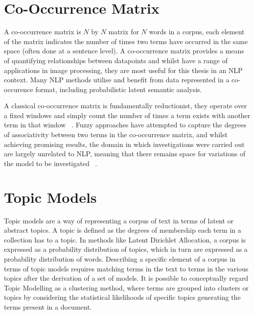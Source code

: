 \documentclass[10pt]{report}
\begin{document}
\section{Co-Occurrence Matrix}
A co-occurrence matrix is $N$ by $N$ matrix for $N$ words in a corpus, each element of the matrix indicates the number of times two terms have occurred in the same space (often done at a sentence level). A co-occurrence matrix provides a means of quantifying relationships between datapoints and whilst have a range of applications in image processing, they are most useful for this thesis in an NLP context. Many NLP methods utilise and benefit from data represented in a co-occurence format, including probabilistic latent semantic analysis.~\cite{Hofmann1999-qb}

A classical co-occurrence matrix is fundamentally reductionist, they operate over a fixed windows and simply count the number of times a term exists with another term in that window ~\cite{Lin2008-ss, Biemann2006-ke}. Fuzzy approaches have attempted to capture the degrees of associativity between two terms in the co-occurrence matrix, and whilst achieving promising results, the domain in which investigations were carried out are largely unrelated to NLP, meaning that there remains space for variations of the model to be investigated ~\cite{Maji2008-xe, Munklang2013-aq }.

\section{Topic Models}
Topic models are a way of representing a corpus of text in terms of latent or abstract topics. A topic is defined as the degrees of membership each term in a collection has to a topic. In methods like Latent Dirichlet Allocation, a corpus is expressed as a probability distribution of topics, which in turn are expressed as a probability distribution of words. Describing a specific element of a corpus in terms of topic models requires matching terms in the text to terms in the various topics after the derivation of a set of models. It is possible to conceptually regard Topic Modelling as a clustering method, where terms are grouped into clusters or topics by considering the statistical likelihoods of specific topics generating the terms present in a document.
\end{document}
